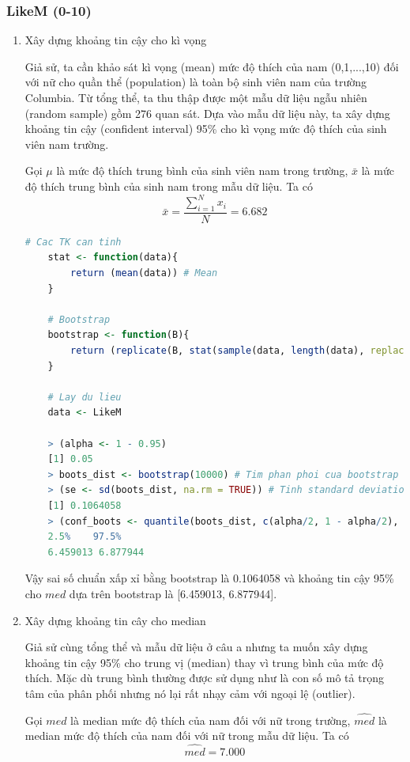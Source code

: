 \documentclass[a4paper,12pt]{article}
\begin{document}
	\subsubsection{LikeM (0-10)}
	\begin{enumerate}[label = \alph*)]
		\item Xây dựng khoảng tin cậy cho kì vọng
		
		Giả sử, ta cần khảo sát kì vọng (mean) mức độ thích của nam (0,1,...,10) đối với nữ cho quần thể (population) là toàn bộ sinh viên nam của trường Columbia. Từ tổng thể, ta thu thập được một mẫu dữ liệu ngẫu nhiên (random sample) gồm 276 quan sát. Dựa vào mẫu dữ liệu này, ta xây dựng khoảng tin cậy (confident interval) 95\% cho kì vọng mức độ thích của sinh viên nam trường.
	
	Gọi $\mu$ là mức độ thích trung bình của sinh viên nam trong trường, $\bar{x}$ là mức độ thích trung bình của sinh nam trong mẫu dữ liệu. Ta có
		$$\bar{x} = \frac{\sum_{i = 1}^{N}x_i}{N} =  6.682$$
	\begin{lstlisting}[language=R]
	# Cac TK can tinh
	stat <- function(data){
		return (mean(data)) # Mean
	}
	
	# Bootstrap
	bootstrap <- function(B){
		return (replicate(B, stat(sample(data, length(data), replace = TRUE))))
	}
	
	# Lay du lieu
	data <- LikeM
	
	> (alpha <- 1 - 0.95)
	[1] 0.05
	> boots_dist <- bootstrap(10000) # Tim phan phoi cua bootstrap
	> (se <- sd(boots_dist, na.rm = TRUE)) # Tinh standard deviation (missing value se bi bo qua)
	[1] 0.1064058
	> (conf_boots <- quantile(boots_dist, c(alpha/2, 1 - alpha/2), na.rm = TRUE)) # Tim khoang tin cay cho mean
	2.5%    97.5% 
	6.459013 6.877944
	\end{lstlisting}
	Vậy sai số chuẩn xấp xỉ bằng bootstrap là 0.1064058 và khoảng tin cậy 95\% cho $med$ dựa trên bootstrap
	là [6.459013, 6.877944].
		\item Xây dựng khoảng tin cây cho median
		
		Giả sử cùng tổng thể và mẫu dữ liệu ở câu a nhưng ta muốn xây dựng khoảng tin cậy 95\% cho
		trung vị (median) thay vì trung bình của mức độ thích. Mặc dù trung bình thường được sử dụng như
		là con số mô tả trọng tâm của phân phối nhưng nó lại rất nhạy cảm với ngoại lệ (outlier).
		
		Gọi $med$ là median mức độ thích của nam đối với nữ trong trường, $\hat{med}$ là median mức độ thích của nam đối với nữ trong mẫu dữ liệu. Ta có
		$$\hat{med} = 7.000$$
		

\end{enumerate}
\end{document}
